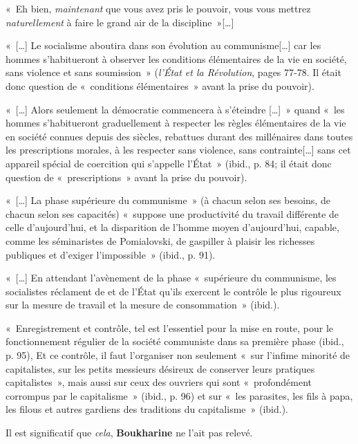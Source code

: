 \documentclass[french,twoside]{book} %
\newenvironment{quoteblock}%
  {\begin{quoting}}
  {\end{quoting}}
\newenvironment{quotebar}{%
    \def\FrameCommand{{\color{rubric!10!}\vrule width 0.5em} \hspace{0.9em}}%
    \def\OuterFrameSep{\itemsep} %
    \MakeFramed {\advance\hsize-\width \FrameRestore}
  }%
  {%
    \endMakeFramed
  }
\renewenvironment{quoteblock}%
  {%
    \savenotes
    \setstretch{0.9}
    \normalfont
    \begin{quotebar}
  }
  {%
    \end{quotebar}
    \spewnotes
  }
\begin{document}
\begin{quoteblock}
 \noindent « Eh bien, \emph{maintenant} que vous avez pris le pouvoir, vous vous mettrez \emph{naturellement} à faire le grand air de la discipline »[…]\par
 « […] Le socialisme aboutira dans son évolution au communisme[…] car les hommes s’habitueront à observer les conditions élémentaires de la vie en société, sans violence et sans soumission » (\emph{l’État et la Révolution}, pages 77‑78. Il était donc question de « conditions élémentaires » avant la prise du pouvoir).\par
 « […] Alors seulement la démocratie commencera à s’éteindre […] » quand « les hommes s’habitueront graduellement à respecter les règles élémentaires de la vie en société connues depuis des siècles, rebattues durant des millénaires dans toutes les prescriptions morales, à les respecter sans violence, sans contrainte[…] sans cet appareil spécial de coercition qui s’appelle l’État » (ibid., p. 84; il était donc question de « prescriptions » avant la prise du pouvoir).\par
 « […] La phase supérieure du communisme » (à chacun selon ses besoins, de chacun selon ses capacités) « suppose une productivité du travail différente de celle d’aujourd’hui, et la disparition de l’homme moyen d’aujourd’hui, capable, comme les séminaristes de Pomialovski, de gaspiller à plaisir les richesses publiques et d’exiger l’impossible » (ibid., p. 91).\par
 « […] En attendant l’avènement de la phase « supérieure du communisme, les socialistes réclament de et de l’État qu’ils exercent le contrôle le plus rigoureux sur la mesure de travail et la mesure de consommation » (ibid.).\par
 « Enregistrement et contrôle, tel est l’essentiel pour la mise en route, pour le fonctionnement régulier de la société communiste dans sa première phase (ibid., p. 95), Et ce contrôle, il faut l’organiser non seulement « sur l’infime minorité de capitalistes, sur les petits messieurs désireux de conserver leurs pratiques capitalistes », mais aussi sur ceux des ouvriers qui sont \hspace{1em}« profondément corrompus par le capitalisme » (ibid., p. 96) et sur « les parasites, les fils à papa, les filous et autres gardiens des traditions du capitalisme » (ibid.).
\end{quoteblock}

\bigbreak
\noindent Il est significatif que \emph{cela}, \textbf{Boukharine} ne l’ait pas relevé.
 
\end{document}
